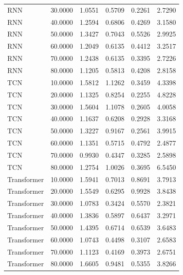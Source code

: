 \begin{tabular}{lrrrrr}
RNN & 30.0000 & 1.0551 & 0.5709 & 0.2261 & 2.7290 \\
RNN & 40.0000 & 1.2594 & 0.6806 & 0.4269 & 3.1580 \\
RNN & 50.0000 & 1.3427 & 0.7043 & 0.5526 & 2.9925 \\
RNN & 60.0000 & 1.2049 & 0.6135 & 0.4412 & 3.2517 \\
RNN & 70.0000 & 1.2438 & 0.6135 & 0.3395 & 2.7226 \\
RNN & 80.0000 & 1.1205 & 0.5813 & 0.4208 & 2.8158 \\
TCN & 10.0000 & 1.5812 & 1.1262 & 0.3459 & 4.3398 \\
TCN & 20.0000 & 1.1325 & 0.8254 & 0.2255 & 4.8228 \\
TCN & 30.0000 & 1.5604 & 1.1078 & 0.2605 & 4.0058 \\
TCN & 40.0000 & 1.1637 & 0.6208 & 0.2928 & 3.3168 \\
TCN & 50.0000 & 1.3227 & 0.9167 & 0.2561 & 3.9915 \\
TCN & 60.0000 & 1.1351 & 0.5715 & 0.4792 & 2.4877 \\
TCN & 70.0000 & 0.9930 & 0.4347 & 0.3285 & 2.5898 \\
TCN & 80.0000 & 1.2754 & 1.0026 & 0.3695 & 6.5450 \\
Transformer & 10.0000 & 1.5941 & 0.7013 & 0.8691 & 3.7913 \\
Transformer & 20.0000 & 1.5549 & 0.6295 & 0.9928 & 3.8438 \\
Transformer & 30.0000 & 1.0783 & 0.3424 & 0.5570 & 2.3821 \\
Transformer & 40.0000 & 1.3836 & 0.5897 & 0.6437 & 3.2971 \\
Transformer & 50.0000 & 1.4395 & 0.6714 & 0.6539 & 3.6483 \\
Transformer & 60.0000 & 1.0743 & 0.4498 & 0.3107 & 2.6583 \\
Transformer & 70.0000 & 1.1123 & 0.4169 & 0.3973 & 2.6751 \\
Transformer & 80.0000 & 1.6605 & 0.9481 & 0.5355 & 3.8266 \\
\bottomrule
\end{tabular}
